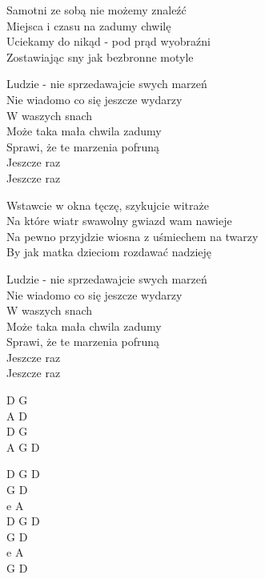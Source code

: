 \begin{text}
Samotni ze sobą nie możemy znaleźć\\
Miejsca i czasu na zadumy chwilę\\
Uciekamy do nikąd - pod prąd wyobraźni\\
Zostawiając sny jak bezbronne motyle

\vin Ludzie - nie sprzedawajcie swych marzeń \\
\vin Nie wiadomo co się jeszcze wydarzy\\
\vin W waszych snach\\
\vin Może taka mała chwila zadumy\\
\vin Sprawi, że te marzenia pofruną\\
\vin Jeszcze raz\\
\vin Jeszcze raz

Wstawcie w okna tęczę, szykujcie witraże\\
Na które wiatr swawolny gwiazd wam nawieje\\
Na pewno przyjdzie wiosna z uśmiechem na twarzy\\
By jak matka dzieciom rozdawać nadzieję

\vin Ludzie - nie sprzedawajcie swych marzeń \\
\vin Nie wiadomo co się jeszcze wydarzy\\
\vin W waszych snach\\
\vin Może taka mała chwila zadumy\\
\vin Sprawi, że te marzenia pofruną\\
\vin Jeszcze raz\\
\vin Jeszcze raz

\end{text}
\begin{chord}
D G\\
A D\\
D G\\
A G D

D G D\\
G D\\
e A\\
D G D\\
G D\\
e A\\
G D
\end{chord}